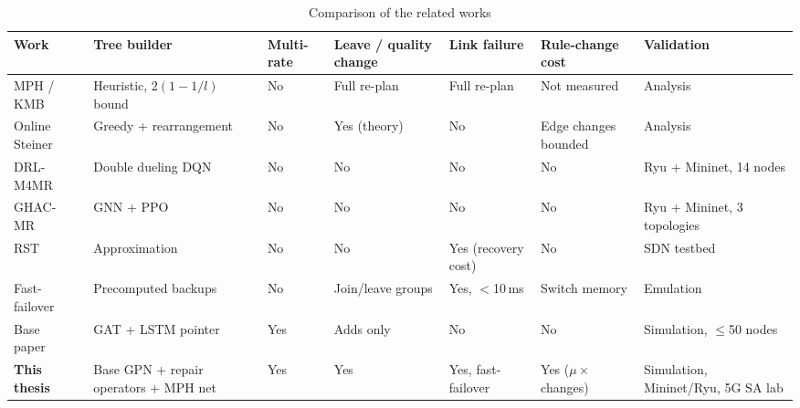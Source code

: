 \begin{table}[!htb]
\caption{Comparison of the related works}
\label{tab:comparison}
\begin{center}
\footnotesize
\renewcommand{\arraystretch}{1.1}
\begin{tabular}{|L{2.3cm}|L{2.4cm}|C{1.2cm}|L{1.8cm}|L{1.8cm}|L{1.9cm}|L{2.1cm}|}
\hline
\textbf{Work} & \textbf{Tree builder} & \textbf{Multi-rate} & \textbf{Leave / quality change} & \textbf{Link failure} & \textbf{Rule-change cost} & \textbf{Validation} \\
\hline\hline
MPH / KMB~\cite{takahashi1980mph,kou1981kmb} & Heuristic, $2(1-1/l)$ bound & No & Full re-plan & Full re-plan & Not measured & Analysis \\ \hline
Online Steiner~\cite{imase1991dynamic} & Greedy + rearrangement & No & Yes (theory) & No & Edge changes bounded & Analysis \\ \hline
DRL-M4MR~\cite{zhao2022drlm4mr} & Double dueling DQN & No & No & No & No & Ryu + Mininet, 14 nodes \\ \hline
GHAC-MR~\cite{zhang2026ghacmr} & GNN + PPO & No & No & No & No & Ryu + Mininet, 3 topologies \\ \hline
RST~\cite{shen2015rst} & Approximation & No & No & Yes (recovery cost) & No & SDN testbed \\ \hline
Fast-failover~\cite{oostenbrink2017failover} & Precomputed backups & No & Join/leave groups & Yes, $<$10\,ms & Switch memory & Emulation \\ \hline
Base paper~\cite{wang2026gnn} & GAT + LSTM pointer & Yes & Adds only & No & No & Simulation, $\le$50 nodes \\ \hline
\textbf{This thesis} & Base GPN + repair operators + MPH net & Yes & Yes & Yes, fast-failover & Yes ($\mu\times$ changes) & Simulation, Mininet/Ryu, 5G SA lab \\
\hline
\end{tabular}
\end{center}
\end{table}

